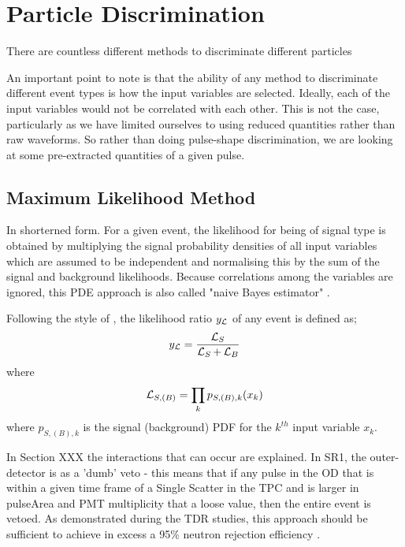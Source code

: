 \section{Particle Discrimination}
\par
There are countless different methods to discriminate different particles


\par
An important point to note is that the ability of any method to discriminate different event types is how the input variables are selected.
Ideally, each of the input variables would not be correlated with each other.
This is not the case, particularly as we have limited ourselves to using reduced quantities rather than raw waveforms.
So rather than doing pulse-shape discrimination, we are looking at some pre-extracted quantities of a given pulse.

\subsection{Maximum Likelihood Method}
\par
In shorterned form. 
For a given event, the likelihood for being of signal type is obtained by multiplying the signal probability densities of all input variables which are assumed to be independent and normalising this by the sum of the signal and background likelihoods.
Because correlations among the variables are ignored, this PDE approach is also called "naive Bayes estimator" \cite{TMVA_ref}.

Following the style of \cite{TMVA_ref}, the likelihood ratio $y_{\operatorname{\mathcal{L}}}$ of any event is defined as;
\begin{equation}
    y_{\operatorname{\mathcal{L}}} = \frac{\operatorname{\mathcal{L}}_{S}}{\operatorname{\mathcal{L}}_{S} + \operatorname{\mathcal{L}}_{B}}
\end{equation}
where
\begin{equation}
    \operatorname{\mathcal{L}}_{S,(B)} = \prod_k p_{S,(B),k}(x_k)
\end{equation}
where $p_{S,(B),k}$ is the signal (background) PDF for the $k^{th}$ input variable $x_k$.

\par
In Section XXX the interactions that can occur are explained.
In SR1, the outer-detector is as a 'dumb' veto - this means that if any pulse in the OD that is within a given time frame of a Single Scatter in the TPC and is larger in pulseArea and PMT multiplicity that a loose value, then the entire event is vetoed.
As demonstrated during the TDR studies, this approach should be sufficient to achieve in excess a 95\% neutron rejection efficiency \cite{LZ_TechnicalDesignReview_ref}.

